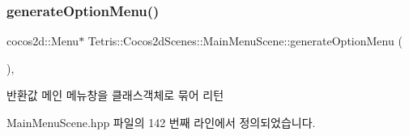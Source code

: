 \subsubsection{\texorpdfstring{generate\+Option\+Menu()}{generateOptionMenu()}}
{\footnotesize\ttfamily cocos2d\+::\+Menu$\ast$ Tetris\+::\+Cocos2d\+Scenes\+::\+Main\+Menu\+Scene\+::generate\+Option\+Menu (\begin{DoxyParamCaption}{ }\end{DoxyParamCaption})\hspace{0.3cm}{\ttfamily [inline]}, {\ttfamily [protected]}}

\begin{DoxyReturn}{반환값}
메인 메뉴창을 클래스객체로 묶어 리턴 
\end{DoxyReturn}


Main\+Menu\+Scene.\+hpp 파일의 142 번째 라인에서 정의되었습니다.


